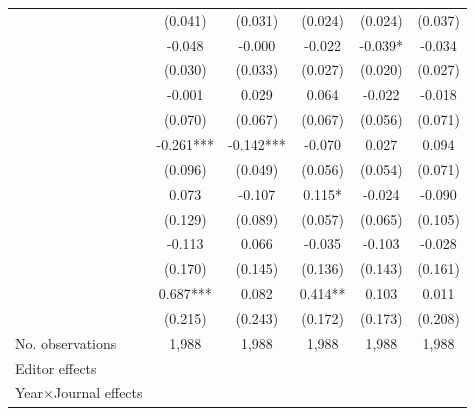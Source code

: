 \begin{table}
\begin{threeparttable}
\begin{tabular}{p{3cm}S@{}S@{}S@{}S@{}S@{}}
                                          &     (0.041)   &     (0.031)   &     (0.024)   &     (0.024)   &     (0.037)   \\
            &      -0.048   &      -0.000   &      -0.022   &      -0.039*  &      -0.034   \\
                                          &     (0.030)   &     (0.033)   &     (0.027)   &     (0.020)   &     (0.027)   \\
                &      -0.001   &       0.029   &       0.064   &      -0.022   &      -0.018   \\
                                          &     (0.070)   &     (0.067)   &     (0.067)   &     (0.056)   &     (0.071)   \\
                        &      -0.261***&      -0.142***&      -0.070   &       0.027   &       0.094   \\
                                          &     (0.096)   &     (0.049)   &     (0.056)   &     (0.054)   &     (0.071)   \\
                     &       0.073   &      -0.107   &       0.115*  &      -0.024   &      -0.090   \\
                                          &     (0.129)   &     (0.089)   &     (0.057)   &     (0.065)   &     (0.105)   \\
                         &      -0.113   &       0.066   &      -0.035   &      -0.103   &      -0.028   \\
                                          &     (0.170)   &     (0.145)   &     (0.136)   &     (0.143)   &     (0.161)   \\
                      &       0.687***&       0.082   &       0.414** &       0.103   &       0.011   \\
                                          &     (0.215)   &     (0.243)   &     (0.172)   &     (0.173)   &     (0.208)   \\
            \midrule
            No. observations              &       1,988   &       1,988   &       1,988   &       1,988   &       1,988   \\
            \midrule
            Editor effects        &           {}   &           {}   &           {}   &           {}   &           {}   \\
            Year\(\times\)Journal effects          &           {}   &           {}   &           {}   &           {}   &           {}   \\

\end{tabular}
\end{threeparttable}
\end{table}
